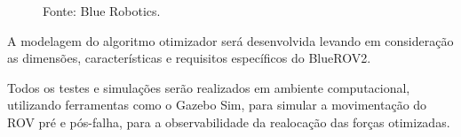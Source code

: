 \documentclass[../main.tex]{subfiles}
\begin{document}
\begin{figure}[H]
  \par\smallskip
  \small Fonte: Blue Robotics.
  \label{rov_view}
\end{figure}

A modelagem do algoritmo otimizador será desenvolvida levando em consideração as dimensões, características e requisitos específicos do BlueROV2.

Todos os testes e simulações serão realizados em ambiente computacional, utilizando ferramentas como o Gazebo Sim, para simular a movimentação do ROV pré e pós-falha, para a observabilidade da realocação das forças otimizadas.
\end{document}
